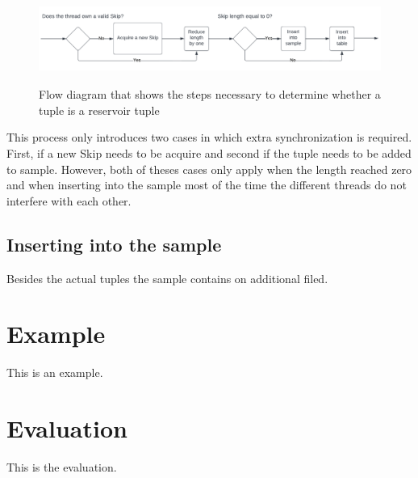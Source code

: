 \documentclass[acmlarge,nonacm]{acmart}
\begin{document}
        \begin{figure}[h]
            \includegraphics[height=2.9cm]{figure3.pdf}
            \caption{Flow diagram that shows the steps necessary to determine whether a tuple is a reservoir tuple}
        \end{figure}

        This process only introduces two cases in which extra synchronization is required. First, if a new Skip needs to be acquire and second if the tuple needs to be added to sample. However, both of theses cases only apply when the length reached zero and when inserting into the sample most of the time the different threads do not interfere with each other.

    \subsection{Inserting into the sample}

        Besides the actual tuples the sample contains on additional filed.

    \section{Example}
        This is an example.

    \section{Evaluation}
        This is the evaluation.
\end{document}
